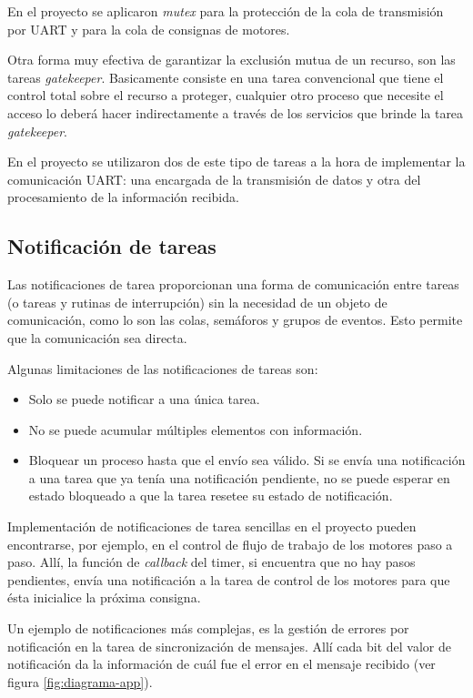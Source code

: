 \documentclass{IEEEtran}
\begin{document}
En el proyecto se aplicaron \textit{mutex} para la protección de la cola de transmisión por UART y para la cola de consignas de motores.

Otra forma muy efectiva de garantizar la exclusión mutua de un recurso, son las tareas \textit{gatekeeper}. Basicamente consiste en una tarea convencional que tiene el control total sobre el recurso a proteger, cualquier otro proceso que necesite el acceso lo deberá hacer indirectamente a través de los servicios que brinde la tarea \textit{gatekeeper}. 

En el proyecto se utilizaron dos de este tipo de tareas a la hora de implementar la comunicación UART: una encargada de la transmisión de datos y otra del procesamiento de la información recibida.

\subsection{Notificación de tareas}
Las notificaciones de tarea proporcionan una forma de comunicación entre tareas (o tareas y rutinas de interrupción) sin la necesidad de un objeto de comunicación, como lo son las colas, semáforos y grupos de eventos. Esto permite que la comunicación sea directa.

Algunas limitaciones de las notificaciones de tareas son:

\begin{itemize}
    \item Solo se puede notificar a una única tarea.
    \item No se puede acumular múltiples elementos con información.
    \item Bloquear un proceso hasta que el envío sea válido. Si se envía una notificación a una tarea que ya tenía una notificación pendiente, no se puede esperar en estado bloqueado a que la tarea resetee su estado de notificación.
\end{itemize}

Implementación de notificaciones de tarea sencillas en el proyecto pueden encontrarse, por ejemplo, en el control de flujo de trabajo de los motores paso a paso. Allí, la función de \textit{callback} del timer, si encuentra que no hay pasos pendientes, envía una notificación a la tarea de control de los motores para que ésta inicialice la próxima consigna.

Un ejemplo de notificaciones más complejas, es la gestión de errores por notificación en la tarea de sincronización de mensajes. Allí cada bit del valor de notificación da la información de cuál fue el error en el mensaje recibido (ver figura \ref{fig:diagrama-app}).
\end{document}
